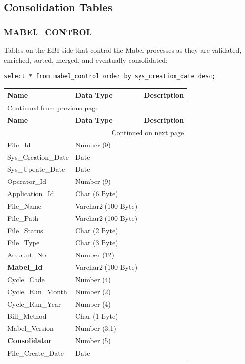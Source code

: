\documentclass[12pt,twoside]{article}
\begin{document}
\subsection{Consolidation Tables}
\label{sec:orgheadline153}
\subsubsection{MABEL\_CONTROL}
\label{sec:orgheadline145}
Tables on the EBI side that control the Mabel processes as they are validated, enriched, sorted, merged, and eventually consolidated:
\begin{verbatim}
select * from mabel_control order by sys_creation_date desc;
\end{verbatim}
\footnotesize
\begin{longtable}{l|l|l}
\hline
\textbf{Name} & \textbf{Data Type} & \textbf{Description}\\
\hline
\endfirsthead
\multicolumn{3}{l}{Continued from previous page} \\
\hline

\textbf{Name} & \textbf{Data Type} & \textbf{Description} \\

\hline
\endhead
\hline\multicolumn{3}{r}{Continued on next page} \\
\endfoot
\endlastfoot
\hline
File\_Id & Number (9) & \\
Sys\_Creation\_Date & Date & \\
Sys\_Update\_Date & Date & \\
Operator\_Id & Number (9) & \\
Application\_Id & Char (6 Byte) & \\
File\_Name & Varchar2 (100 Byte) & \\
File\_Path & Varchar2 (100 Byte) & \\
File\_Status & Char (2 Byte) & \\
File\_Type & Char (3 Byte) & \\
Account\_No & Number (12) & \\
\textbf{Mabel\_Id} & Varchar2 (100 Byte) & \\
Cycle\_Code & Number (4) & \\
Cycle\_Run\_Month & Number (2) & \\
Cycle\_Run\_Year & Number (4) & \\
Bill\_Method & Char (1 Byte) & \\
Mabel\_Version & Number (3,1) & \\
\textbf{Consolidator} & Number (5) & \\
File\_Create\_Date & Date & \\
\hline
\end{longtable}
\end{document}
